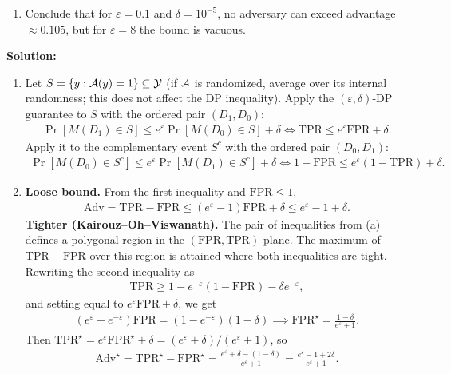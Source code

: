 \documentclass[12pt]{article}
\begin{document}
\begin{enumerate}
\begin{enumerate}
    \item Conclude that for $\varepsilon = 0.1$ and $\delta = 10^{-5}$, no adversary can exceed advantage $\approx 0.105$, but for $\varepsilon = 8$ the bound is vacuous.
\end{enumerate}

\begin{solution}
{\bf Solution:}\\
\begin{enumerate}
    \item Let $S = \{y : {\cal A}(y) = 1\} \subseteq {\cal Y}$ (if ${\cal A}$ is randomized, average over its internal randomness; this does not affect the DP inequality). Apply the $(\varepsilon, \delta)$-DP guarantee to $S$ with the ordered pair $(D_1, D_0)$:
    \begin{align*}
        \Pr[M(D_1) \in S] \le e^\varepsilon \Pr[M(D_0) \in S] + \delta \iff \mathrm{TPR} \le e^\varepsilon \mathrm{FPR} + \delta.
    \end{align*}
    Apply it to the complementary event $S^c$ with the ordered pair $(D_0, D_1)$:
    \begin{align*}
        \Pr[M(D_0) \in S^c] \le e^\varepsilon \Pr[M(D_1) \in S^c] + \delta \iff 1 - \mathrm{FPR} \le e^\varepsilon(1 - \mathrm{TPR}) + \delta.
    \end{align*}

    \item \textbf{Loose bound.} From the first inequality and $\mathrm{FPR} \le 1$,
    \begin{align*}
        \mathrm{Adv} = \mathrm{TPR} - \mathrm{FPR} \le (e^\varepsilon - 1)\mathrm{FPR} + \delta \le e^\varepsilon - 1 + \delta.
    \end{align*}
    \textbf{Tighter (Kairouz--Oh--Viswanath).} The pair of inequalities from (a) defines a polygonal region in the $(\mathrm{FPR}, \mathrm{TPR})$-plane. The maximum of $\mathrm{TPR} - \mathrm{FPR}$ over this region is attained where both inequalities are tight. Rewriting the second inequality as
    \begin{align*}
        \mathrm{TPR} \ge 1 - e^{-\varepsilon}(1 - \mathrm{FPR}) - \delta e^{-\varepsilon},
    \end{align*}
    and setting equal to $e^\varepsilon \mathrm{FPR} + \delta$, we get
    \begin{align*}
        (e^\varepsilon - e^{-\varepsilon})\mathrm{FPR} = (1 - e^{-\varepsilon})(1 - \delta) \implies \mathrm{FPR}^\star = \frac{1-\delta}{e^\varepsilon + 1}.
    \end{align*}
    Then $\mathrm{TPR}^\star = e^\varepsilon \mathrm{FPR}^\star + \delta = (e^\varepsilon + \delta)/(e^\varepsilon + 1)$, so
    \begin{align*}
        \mathrm{Adv}^\star = \mathrm{TPR}^\star - \mathrm{FPR}^\star = \frac{e^\varepsilon + \delta - (1 - \delta)}{e^\varepsilon + 1} = \frac{e^\varepsilon - 1 + 2\delta}{e^\varepsilon + 1}.
    \end{align*}


\end{enumerate}
\end{solution}
\end{enumerate}
\end{document}
